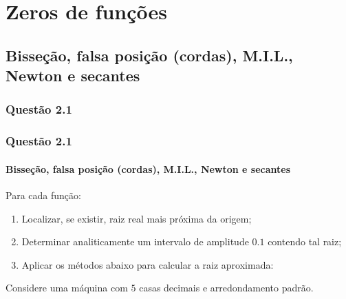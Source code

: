 \section{Zeros de funções}
\subsection[Métodos de quebra e métodos iterativos]{Bisseção, falsa posição
(cordas), M.I.L., Newton e secantes}

\subsubsection{Questão 2.1}

\begin{frame}
\frametitle{Questão 2.1}
\framesubtitle{Bisseção, falsa posição (cordas), M.I.L., Newton e secantes}
{\small
Para cada função:
\begin{enumerate}
  \item Localizar, se existir, raiz real mais próxima da origem;
  \item Determinar analiticamente um intervalo de amplitude $0.1$ contendo tal
  raiz;
  \item Aplicar os métodos abaixo para calcular a raiz aproximada: 
\end{enumerate}
Considere uma máquina com $5$ casas decimais e arredondamento padrão.
}

\end{frame}

